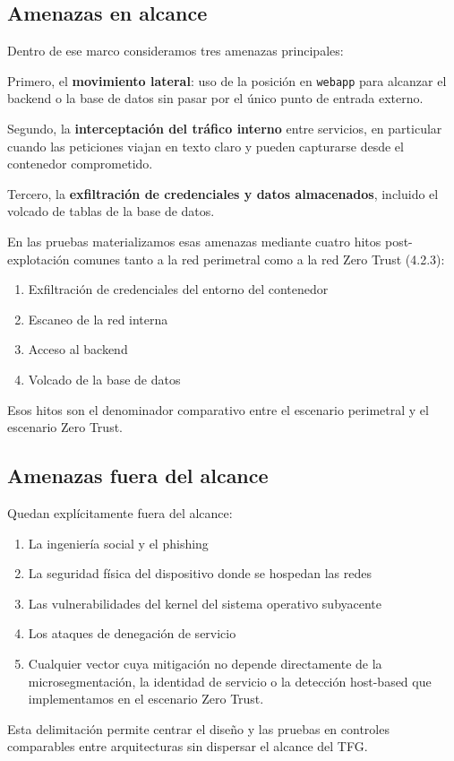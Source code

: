 \documentclass[11pt,spanish,listoffigures,listoftables]{tfgetsinf}
\begin{document}
        \subsection{Amenazas en alcance}
        Dentro de ese marco consideramos tres amenazas principales:

        Primero, el \textbf{movimiento lateral}: uso de la posición en \texttt{webapp} para alcanzar el backend o la base de datos sin pasar por el único punto de entrada externo.
        
        Segundo, la \textbf{interceptación del tráfico interno} entre servicios, en particular cuando las peticiones viajan en texto claro y pueden capturarse desde el contenedor comprometido. 
        
        Tercero, la \textbf{exfiltración de credenciales y datos almacenados}, incluido el volcado de tablas de la base de datos.
        
        En las pruebas materializamos esas amenazas mediante cuatro hitos post-explotación comunes tanto a la red perimetral como a la red Zero Trust (4.2.3): 
        \begin{enumerate}
            \item Exfiltración de credenciales del entorno del contenedor
            \item Escaneo de la red interna
            \item Acceso al backend
            \item Volcado de la base de datos
        \end{enumerate}
        Esos hitos son el denominador comparativo entre el escenario perimetral y el escenario Zero Trust.
        
        \subsection{Amenazas fuera del alcance}
        Quedan explícitamente fuera del alcance:
        \begin{enumerate}
            \item La ingeniería social y el phishing
            \item La seguridad física del dispositivo donde se hospedan las redes
            \item Las vulnerabilidades del kernel del sistema operativo subyacente
            \item Los ataques de denegación de servicio
            \item Cualquier vector cuya mitigación no depende directamente de la microsegmentación, la identidad de servicio o la detección host-based que implementamos en el escenario Zero Trust.
        \end{enumerate}
        Esta delimitación permite centrar el diseño y las pruebas en controles comparables entre arquitecturas sin dispersar el alcance del TFG.
\end{document}
